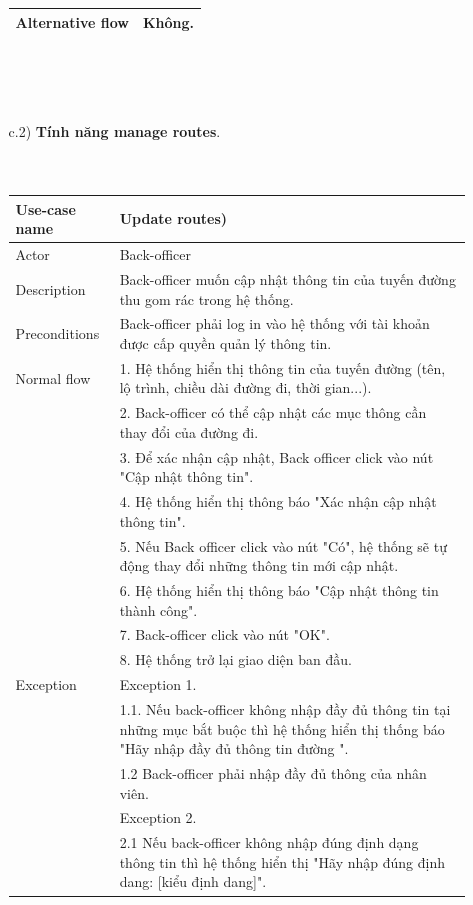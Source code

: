 \documentclass[a4paper]{article}
\begin{document}
\begin{enumerate}
\begin{enumerate}
\begin{tabular}{|p{3cm} |p{10cm} |}
         \hline
         Alternative flow & Không. \\
         \hline
    \end{tabular}
    \\ \\ \\
    \item[c.2)] \textbf{Tính năng manage routes}.
    \\ \\ \\
    \begin{tabular}{|p{3cm} | p{10cm}|}
    \hline
         Use-case name & \textbf{Update routes)}  \\
         \hline
         Actor & Back-officer \\
         \hline 
         Description & Back-officer muốn cập nhật thông tin của tuyến đường thu gom rác trong hệ thống. \\
         \hline
         Preconditions & Back-officer phải log in vào hệ thống với tài khoản được cấp quyền quản lý thông tin.\\
         \hline
         Normal flow 
         &1. Hệ thống hiển thị thông tin của tuyến đường (tên, lộ trình, chiều dài đường đi, thời gian...). \\
         &2. Back-officer có thể cập nhật các mục thông cần thay đổi của đường đi. \\
         &3. Để xác nhận cập nhật, Back officer click vào nút "Cập nhật thông tin". \\
         &4. Hệ thống hiển thị thông báo "Xác nhận cập nhật thông tin". \\ 
         &5. Nếu Back officer click vào nút "Có", hệ thống sẽ tự động thay đổi những thông tin mới cập nhật. \\
         &6. Hệ thống hiển thị thông báo "Cập nhật thông tin thành công". \\
         &7. Back-officer click vào nút "OK". \\
         &8. Hệ thống trở lại giao diện ban đầu. \\
         \hline
        Exception & Exception 1. \\
        &1.1. Nếu back-officer không nhập đầy đủ thông tin tại những mục bắt buộc thì hệ thống hiển thị thống báo "Hãy nhập đầy đủ thông tin đường ". \\
        &1.2 Back-officer phải nhập đầy đủ thông của nhân viên. \\
        &Exception 2.\\
        &2.1 Nếu back-officer không nhập đúng định dạng thông tin thì hệ thống hiển thị "Hãy nhập đúng định dang: [kiểu định dang]".\\

\end{tabular}
\end{enumerate}
\end{enumerate}
\end{document}

